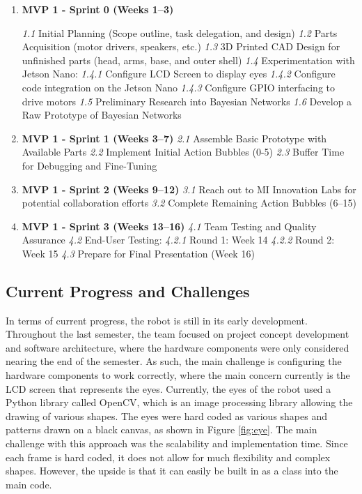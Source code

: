 \begin{enumerate}
\item\textbf{MVP 1 - Sprint 0 (Weeks 1–3)}

\subitem \textit{1.1} Initial Planning (Scope outline, task delegation, and design)
\subitem \textit{1.2} Parts Acquisition (motor drivers, speakers, etc.)
\subitem \textit{1.3} 3D Printed CAD Design for unfinished parts (head, arms, base, and outer shell)
\subitem \textit{1.4} Experimentation with Jetson Nano:
      \subsubitem \textit{1.4.1} Configure LCD Screen to display eyes
      \subsubitem \textit{1.4.2} Configure code integration on the Jetson Nano
      \subsubitem \textit{1.4.3} Configure GPIO interfacing to drive motors
\subitem \textit{1.5} Preliminary Research into Bayesian Networks
\subitem \textit{1.6} Develop a Raw Prototype of Bayesian Networks 

\item \textbf{MVP 1 - Sprint 1 (Weeks 3–7)}
\subitem \textit{2.1} Assemble Basic Prototype with Available Parts
\subitem \textit{2.2} Implement Initial Action Bubbles (0-5)
\subitem \textit{2.3} Buffer Time for Debugging and Fine-Tuning

\item \textbf{MVP 1 - Sprint 2 (Weeks 9–12)}
\subitem \textit{3.1} Reach out to MI Innovation Labs for potential collaboration efforts
\subitem \textit{3.2} Complete Remaining Action Bubbles (6–15)

\item \textbf{MVP 1 - Sprint 3 (Weeks 13–16)}
\subitem \textit{4.1} Team Testing and Quality Assurance
\subitem \textit{4.2} End-User Testing:
     \subsubitem \textit{4.2.1} Round 1: Week 14
     \subsubitem \textit{4.2.2} Round 2: Week 15
\subitem \textit{4.3} Prepare for Final Presentation (Week 16)
\end{enumerate}

\subsection{Current Progress and Challenges}
In terms of current progress, the robot is still in its early development. Throughout the last semester, the team focused on project concept development and software architecture, where the hardware components were only considered nearing the end of the semester. As such, the main challenge is configuring the hardware components to work correctly, where the main concern currently is the LCD screen that represents the eyes. Currently, the eyes of the robot used a Python library called OpenCV, which is an image processing library allowing the drawing of various shapes. The eyes were hard coded as various shapes and patterns drawn on a black canvas, as shown in Figure \ref{fig:eye}. The main challenge with this approach was the scalability and implementation time. Since each frame is hard coded, it does not allow for much flexibility and complex shapes. However, the upside is that it can easily be built in as a class into the main code. 

